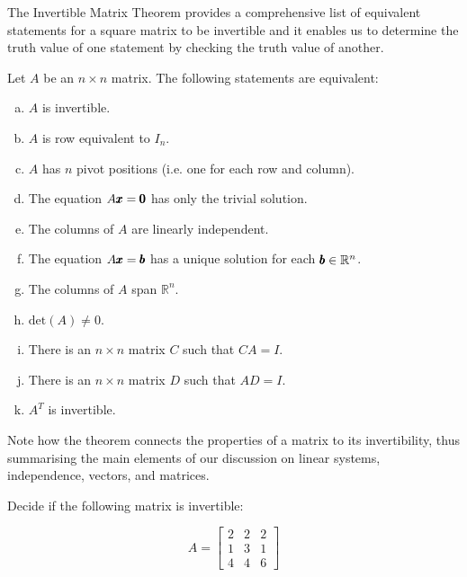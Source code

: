 The Invertible Matrix Theorem provides a comprehensive list of equivalent statements for a square matrix to be invertible and it enables us to determine the truth value of one statement by checking the truth value of another.

\newpage

\begin{theorem}
    Let \( A \) be an \( n \times n \) matrix. The following statements are equivalent:
    \begin{enumerate}[(a)]
        \item $A$ is invertible.
        \item $A$ is row equivalent to $I_n$.
        \item $A$ has $n$ pivot positions (i.e. one for each row and column).
        \item The equation $A \pmb{x}=\pmb{0}$ has only the trivial solution.
        \item The columns of $A$ are linearly independent.
        \item The equation \( A \pmb{x} = \pmb{b} \) has a unique solution for each \( \pmb{b} \in \mathbb{R}^n \).
        \item The columns of $A$ span $\mathbb{R}^n$.
        \item \( \text{det}(A) \neq 0 \).
        \item There is an $n \times n$ matrix $C$ such that $C A=I$.
        \item There is an $n \times n$ matrix $D$ such that $A D=I$.
        \item $A^T$ is invertible.
    \end{enumerate}
\end{theorem}

Note how the theorem connects the properties of a matrix to its invertibility, thus summarising the main elements of our discussion on linear systems, independence, vectors, and matrices.

\begin{example} Decide if the following matrix is invertible:

\[
A=\left[\begin{array}{lll}
2 & 2 & 2 \\
1 & 3 & 1 \\
4 & 4 & 6
\end{array}\right]
\]

\end{example}

